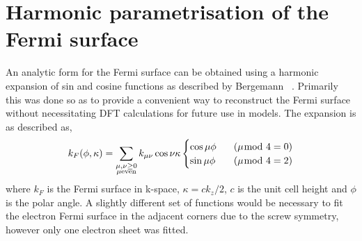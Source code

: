 
\section{Harmonic parametrisation of the Fermi surface}
    \label{Sec:ResD:TightBindingFits}

An analytic form for the Fermi surface can be obtained using a harmonic expansion of sin and cosine functions as described by Bergemann \etal~\cite{Bergemann2000}. Primarily this was done so as to provide a convenient way to reconstruct the Fermi surface without necessitating \ac{DFT} calculations for future use in models. The expansion is as described as,
\begin{equation}
\label{Eqn:ResD:HarmonicExpansion}
k_F(\phi, \kappa) = \sum_{\substack{\mu,\nu \geq 0 \\ \mu \textrm{even}}}
    k_{\mu\nu}\cos\nu\kappa 
    \begin{cases}
        \cos{\mu\phi} \hspace{8pt} &(\mu\hspace{-6pt}\mod4 = 0) \\
        \sin{\mu\phi} \hspace{8pt} &(\mu\hspace{-6pt}\mod4 = 2)
    \end{cases}
\end{equation}
where $k_F$ is the Fermi surface in k-space, $\kappa = ck_z/2$, $c$ is the unit cell height and $\phi$ is the polar angle. A slightly different set of functions would be necessary to fit the electron Fermi surface in the adjacent corners due to the screw symmetry, however only one electron sheet was fitted.

